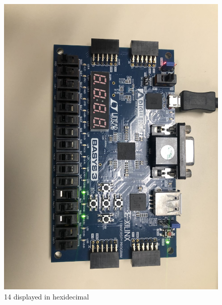 \documentclass[11pt]{article}
\begin{document}
\begin{figure}[ht]\centering
	\includegraphics[width= \textwidth ]{bb1}
	\caption{14 displayed in hexidecimal}
	\label{fig: bb1}
\end{figure}
\end{document}

